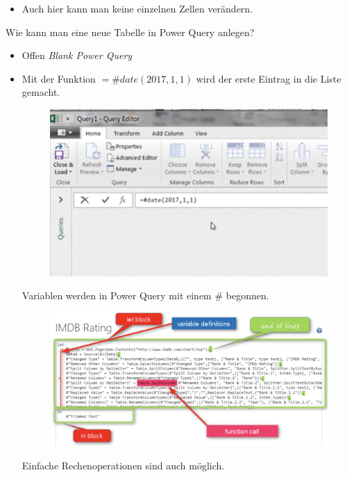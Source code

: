 \begin{description}
\begin{itemize}
\begin{figure}[H]
	\caption{}
	\label{fig:screenshot027}
\end{figure}
\item Auch hier kann man keine einzelnen Zellen verändern.
\end{itemize}
Wie kann man eine neue Tabelle in Power Query anlegen?
\begin{itemize}
\item Offen \textit{Blank Power Query}
\item Mit der Funktion $=\#date(2017,1,1)$ wird der erste Eintrag in die Liste gemacht.
\begin{figure}[H]
	\centering
	\includegraphics[scale = 0.3]{attachment/chapter_1/screenshot028}
	\caption{}
	\label{fig:screenshot028}
\end{figure}
Variablen werden in Power Query mit einem $\#$ begonnen.
\begin{figure}[H]
	\centering
	\includegraphics[scale = 0.3]{attachment/chapter_1/screenshot029}
	\caption{}
	\label{fig:screenshot029}
\end{figure}
Einfache Rechenoperationen sind auch möglich.
\end{itemize}
\end{description}

